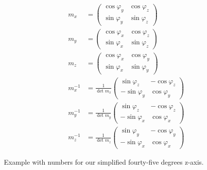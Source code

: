 \documentclass[a4paper]{article}
\begin{document}
\begin{displaymath}
\begin{align}

	m_x &= \begin{pmatrix}\cos \varphi_y & \cos \varphi_z\\ \sin \varphi_y & \sin \varphi_z \end{pmatrix}\\
	m_y &= \begin{pmatrix}\cos \varphi_x & \cos \varphi_z\\ \sin \varphi_x & \sin \varphi_z \end{pmatrix}\\
	m_z &= \begin{pmatrix}\cos \varphi_x & \cos \varphi_y\\ \sin \varphi_x & \sin \varphi_y \end{pmatrix}\\
	m^{-1}_x &= \frac{1}{\det{m_x}} \begin{pmatrix}\sin \varphi_z & -\cos \varphi_z\\ -\sin \varphi_y & \cos \varphi_y \end{pmatrix}\\
	m^{-1}_y &= \frac{1}{\det{m_y}} \begin{pmatrix}\sin \varphi_z & -\cos \varphi_z\\ -\sin \varphi_x & \cos \varphi_x \end{pmatrix}\\m^{-1}_z &= \frac{1}{\det{m_z}} \begin{pmatrix}\sin \varphi_y & -\cos \varphi_y\\ -\sin \varphi_x & \cos \varphi_x \end{pmatrix}
\end{align}
\end{displaymath}

Example with numbers for our simplified fourty-five degrees z-axis.
\end{document}
